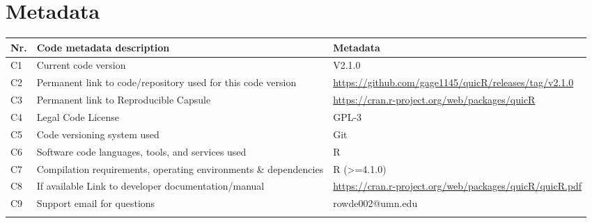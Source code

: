 \documentclass[preprint,12pt,a4paper]{elsarticle}
\providecommand{\DIFaddbeginFL}{} %
\providecommand{\DIFaddendFL}{} %
\providecommand{\DIFdelbeginFL}{} %
\providecommand{\DIFdelendFL}{} %
\begin{document}
    \section*{Metadata}

    \begin{table}[ht]
        \fontsize{9pt}{9pt}\selectfont
        \centering
        \begin{tabular}{lp{6cm}p{6cm}}
            \DIFdelbeginFL %
\DIFdelendFL \DIFaddbeginFL \hline
            \DIFaddendFL \textbf{Nr.} & \textbf{Code metadata description} & \textbf{Metadata} \\
            \DIFdelbeginFL %
\DIFdelendFL \DIFaddbeginFL \hline
            \DIFaddendFL C1 & Current code version & V2.1.0 \\
C2 & Permanent link to code/repository used for this code version & \url{https://github.com/gage1145/quicR/releases/tag/v2.1.0} \\
C3  & Permanent link to Reproducible Capsule & \url{https://cran.r-project.org/web/packages/quicR}\\
C4 & Legal Code License & GPL-3\\
C5 & Code versioning system used & Git\\
C6 & Software code languages, tools, and services used & R\\
C7 & Compilation requirements, operating environments \& dependencies & R (>=4.1.0)\\
C8 & If available Link to developer documentation/manual & \url{https://cran.r-project.org/web/packages/quicR/quicR.pdf}\\
C9 & Support email for questions & rowde002@umn.edu\\
            \DIFdelbeginFL %
\DIFdelendFL \DIFaddbeginFL \\ \hline
        \DIFaddendFL \end{tabular}
    \end{table}
\end{document}
